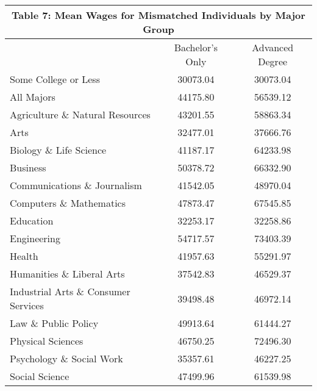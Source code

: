 \documentclass[11pt]{article}
\theoremstyle{definition}
\begin{document}
\scriptsize{
\vspace{2.5mm}
\noindent
\begin{center}
\begin{tabular}{l c c}
\hline\hline
\multicolumn{3}{c}{\textbf{Table 7: Mean Wages for Mismatched Individuals by Major Group}} \\
\hline
 & Bachelor's Only & Advanced Degree \\
\hline
Some College or Less & 30073.04 & 30073.04 \\
All Majors & 44175.80 & 56539.12 \\
Agriculture \& Natural Resources & 43201.55 & 58863.34 \\
Arts & 32477.01 & 37666.76 \\
Biology \& Life Science & 41187.17 & 64233.98 \\
Business & 50378.72 & 66332.90 \\
Communications \& Journalism & 41542.05 & 48970.04 \\
Computers \& Mathematics & 47873.47 & 67545.85  \\
Education & 32253.17 & 32258.86 \\
Engineering & 54717.57 & 73403.39 \\
Health & 41957.63 & 55291.97 \\
Humanities \& Liberal Arts & 37542.83 & 46529.37 \\
Industrial Arts \& Consumer Services & 39498.48 & 46972.14 \\
Law \& Public Policy & 49913.64 & 61444.27 \\
Physical Sciences & 46750.25 & 72496.30 \\
Psychology \& Social Work & 35357.61 & 46227.25 \\
Social Science & 47499.96 & 61539.98 \\
\hline\hline
\end{tabular} 
\end{center}} 
\end{document}

